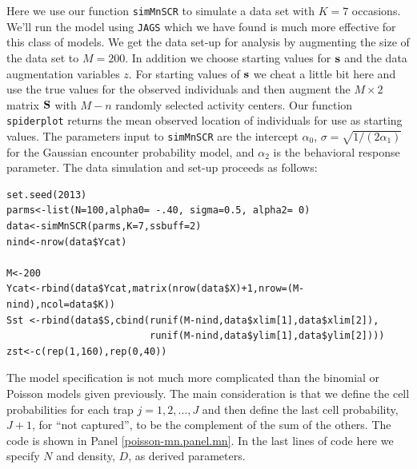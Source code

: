 Here we use our function \mbox{\tt simMnSCR} to simulate a data set
with $K=7$ occasions. 
We'll run the model using \mbox{\tt JAGS}
which we have found is much more effective for this class of models.
We get the data set-up for analysis by augmenting the size of the data
set to $M=200$. In addition we choose starting values for ${\bf s}$
and the data augmentation variables $z$.  For starting values of ${\bf
  s}$ we cheat a little bit here and use the true values for the
observed individuals and then augment the $M \times 2$ matrix ${\bf
  S}$ with $M-n$ randomly selected activity centers. Our function
\mbox{\tt spiderplot} returns the mean observed location of
individuals for use as starting values.  The parameters input to
\mbox{\tt simMnSCR} are the intercept $\alpha_{0}$, $\sigma =
\sqrt{1/(2\alpha_{1})}$ for the Gaussian encounter probability model,
and $\alpha_{2}$ is the behavioral response parameter. The data
simulation and set-up proceeds as follows:
\begin{samepage}
{\small
\begin{verbatim}
set.seed(2013)
parms<-list(N=100,alpha0= -.40, sigma=0.5, alpha2= 0)
data<-simMnSCR(parms,K=7,ssbuff=2)
nind<-nrow(data$Ycat)

M<-200
Ycat<-rbind(data$Ycat,matrix(nrow(data$X)+1,nrow=(M-nind),ncol=data$K))
Sst <-rbind(data$S,cbind(runif(M-nind,data$xlim[1],data$xlim[2]),
                         runif(M-nind,data$ylim[1],data$ylim[2])))
zst<-c(rep(1,160),rep(0,40))
\end{verbatim}
}
\end{samepage}

The model specification is not much more complicated than the binomial
or Poisson models given previously. The main consideration is that we
define the cell probabilities for each trap $j=1,2,\dots,J$ and then
define the last cell probability, $J+1$, for ``not captured'', to be
the complement of the sum of the others. The code is shown in Panel
\ref{poisson-mn.panel.mn}.  In the last lines of code here we specify
$N$ and density, $D$, as derived parameters.

